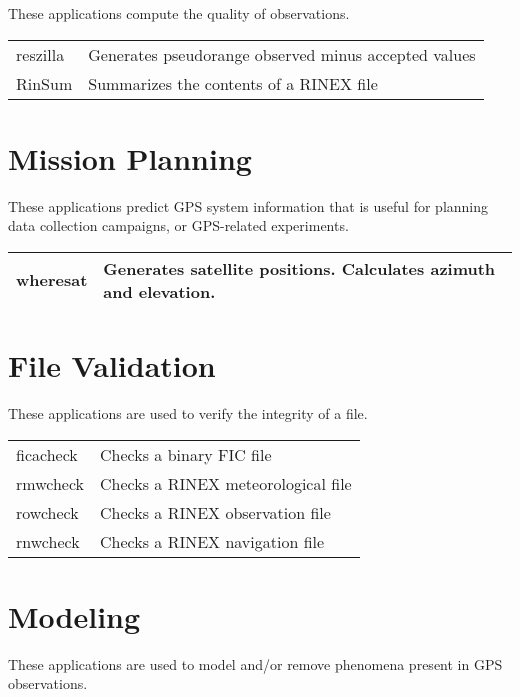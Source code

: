 These applications compute the quality of observations.

\begin{center}
\begin{tabular} {|ll|} 
\hline
reszilla & Generates pseudorange observed minus accepted values \\
RinSum   & Summarizes the contents of a RINEX file \\
\hline
\end{tabular}
\end{center}

\section {Mission Planning}

These applications predict GPS system information that is useful for planning
data collection campaigns, or GPS-related experiments.

\begin{center}
\begin{tabular} {|ll|} 
\hline
wheresat & Generates satellite positions. Calculates azimuth and elevation. \\
\hline
\end{tabular}
\end{center}

\section {File Validation}

These applications are used to verify the integrity of a file.

\begin{center}
\begin{tabular} {|ll|} 
\hline
ficacheck & Checks a binary FIC file \\
rmwcheck  & Checks a RINEX meteorological file \\
rowcheck  & Checks a RINEX observation file \\
rnwcheck  & Checks a RINEX navigation file \\
\hline
\end{tabular}
\end{center}

\section {Modeling}

These applications are used to model and/or remove phenomena present in GPS observations.

